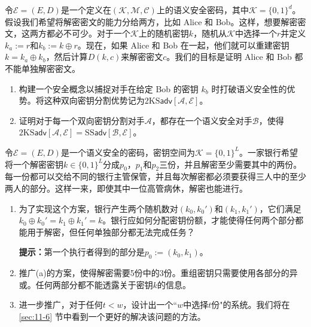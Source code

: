 \begin{exercise}[双向分割密钥]\label{exer:2-19}
令$\mathcal{E}=(E,D)$是一个定义在$(\mathcal{K},\mathcal{M},\mathcal{C})$上的语义安全密码，其中$\mathcal{K}=\{0,1\}^d$。假设我们希望将解密密文的能力分给两方，比如 Alice 和 Bob。这样，想要解密密文，这两方都必不可少。对于一个$\mathcal{K}$上的随机密钥$k$，随机从$\mathcal{K}$中选择一个$r$并定义$k_a:=r$和$k_b:=k\oplus r$。现在，如果 Alice 和 Bob 在一起，他们就可以重建密钥$k=k_a\oplus k_b$，然后计算$D(k,c)$来解密密文$c$。我们的目标是证明 Alice 和 Bob 都不能单独解密密文。
\begin{enumerate}[\indent(a)]
	\item 构建一个安全概念以捕捉对手在给定 Bob 的密钥 $k_b$ 时打破语义安全性的优势。将这种双向密钥分割优势记为$\mathrm{2KS}\mathsf{adv}[\mathcal{A},\mathcal{E}]$。
	\item 证明对于每一个双向密钥分割对手$\mathcal{A}$，都存在一个语义安全对手$\mathcal{B}$，使得$\mathrm{2KS}\mathsf{adv}[\mathcal{A},\mathcal{E}]=\mathrm{SS}\mathsf{adv}[\mathcal{B},\mathcal{E}]$。
\end{enumerate}
\end{exercise}

\begin{exercise}[简单的秘密共享]\label{exer:2-20}
令$\mathcal{E}=(E,D)$是一个语义安全的密码，密钥空间为$\mathcal{K}=\{0,1\}^L$。一家银行希望将一个解密密钥$k\in\{0,1\}^L$分成$p_0$，$p_1$和$p_2$三份，并且解密至少需要其中的两份。每一份都可以交给不同的银行主管保管，并且每次解密都必须要获得三人中的至少两人的部分。这样一来，即使其中一位高管病休，解密也能进行。
\begin{enumerate}[\indent(a)]
	\item 为了实现这个方案，银行产生两个随机数对$(k_0,k_0')$和$(k_1,k_1')$，它们满足$k_0\oplus k_0'=k_1\oplus k_1'=k$。银行应如何分配密钥份额，才能使得任何两个部分都能用于解密，但任何单独部分都无法完成任务？

	\vspace{1pt}

	\textbf{提示：}第一个执行者得到的部分是$p_0:=(k_0,k_1)$。
	\item 推广(a)的方案，使得解密需要5份中的3份。重组密钥只需要使用各部分的异或。任何两部分都不能透露关于密钥$k$的信息。
	\item 进一步推广，对于任何$t<w$，设计出一个``$w$中选择$t$份"的系统。我们将在 \ref{sec:11-6} 节中看到一个更好的解决该问题的方法。
\end{enumerate}
\end{exercise}

